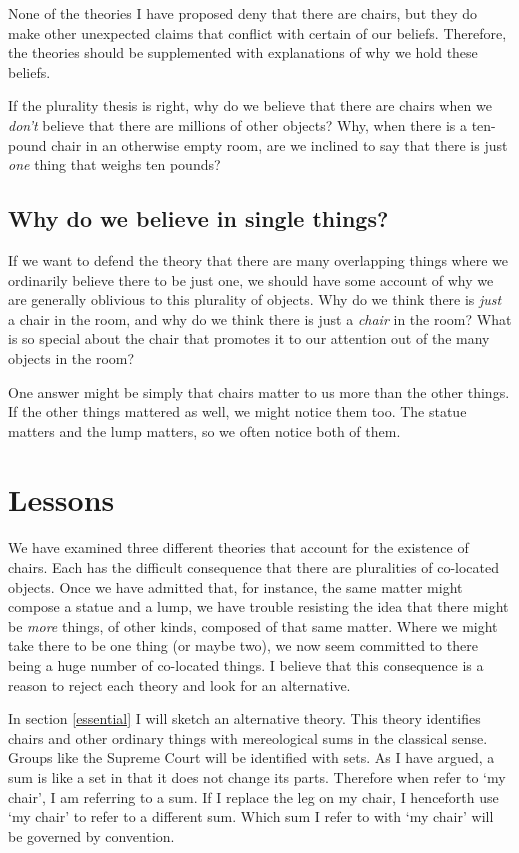 \documentclass[11pt]{article}
\begin{document}
\begin{spacing}{1.5}
None of the theories I have proposed deny that there are chairs, but
they do make other unexpected claims that conflict with certain of our
beliefs.  Therefore, the theories should be supplemented with
explanations of why we hold these beliefs.

If the plurality thesis is right, why do we believe that there are
chairs when we {\em don't} believe that there are millions of other
objects?  Why, when there is a ten-pound chair in an otherwise empty
room, are we inclined to say that there is just {\em one} thing that
weighs ten pounds?

\subsection{Why do we believe in single things?}
\label{exp-single}
If we want to defend the theory that there are many overlapping things
where we ordinarily believe there to be just one, we should have some
account of why we are generally oblivious to this plurality of
objects.  Why do we think there is {\em just} a chair in the room, and
why do we think there is just a {\em chair} in the room?  What is so
special about the chair that promotes it to our attention out of the
many objects in the room?

One answer might be simply that chairs matter to us more than the
other things.  If the other things mattered as well, we might notice
them too.  The statue matters and the lump matters, so we often notice
both of them.

\section{Lessons}
\label{lessons-p}
We have examined three different theories that account for the
existence of chairs.  Each has the difficult consequence that there
are pluralities of co-located objects.  Once we have admitted that,
for instance, the same matter might compose a statue and a lump, we
have trouble resisting the idea that there might be {\em more} things,
of other kinds, composed of that same matter.  Where we might take
there to be one thing (or maybe two), we now seem committed to there
being a huge number of co-located things.  I believe that this
consequence is a reason to reject each theory and look for an
alternative.

In section \ref{essential} I will sketch an alternative theory.  This
theory identifies chairs and other ordinary things with mereological
sums in the classical sense.  Groups like the Supreme Court will be
identified with sets.  As I have argued, a sum is like a set in that
it does not change its parts.  Therefore when refer to `my chair', I
am referring to a sum.  If I replace the leg on my chair, I henceforth
use `my chair' to refer to a different sum.  Which sum I refer to with
`my chair' will be governed by convention.

\ifstandalone
\end{spacing}


\fi
\end{document}
